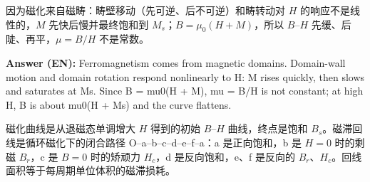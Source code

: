 \documentclass[11pt]{ctexart}
\begin{document}
因为磁化来自磁畴：畴壁移动（先可逆、后不可逆）和畴转动对 \(H\) 的响应不是线性的，\(M\) 先快后慢并最终饱和到 \(M_s\)；\(B=\mu_0(H+M)\)，所以 \(B\)--\(H\) 先缓、后陡、再平，\(\mu=B/H\) 不是常数。

\textbf{Answer (EN):} Ferromagnetism comes from magnetic domains. Domain-wall motion and domain rotation respond nonlinearly to H: M rises quickly, then slows and saturates at Ms. Since B = mu0(H + M), mu = B/H is not constant; at high H, B is about mu0(H + Ms) and the curve flattens.

磁化曲线是从退磁态单调增大 \(H\) 得到的初始 \(B\)--\(H\) 曲线，终点是饱和 \(B_s\)。磁滞回线是循环磁化下的闭合路径 O--a--b--c--d--e--f--a：a 是正向饱和，b 是 \(H=0\) 时的剩磁 \(B_r\)，c 是 \(B=0\) 时的矫顽力 \(H_c\)，d 是反向饱和，e、f 是反向的 \(B_r\)、\(H_c\)。回线面积等于每周期单位体积的磁滞损耗。
\end{document}
